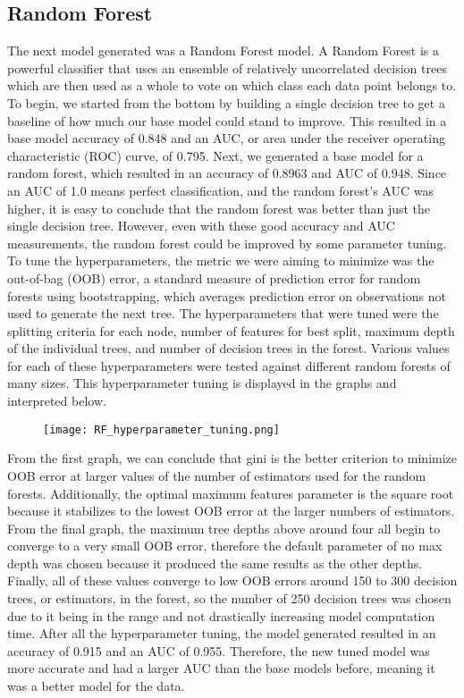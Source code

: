 \documentclass{article}
\begin{document}
\subsection{Random Forest}
The next model generated was a Random Forest model. A Random Forest is a powerful classifier that uses an ensemble of relatively uncorrelated decision trees which are then used as a whole to vote on which class each data point belongs to. To begin, we started from the bottom by building a single decision tree to get a baseline of how much our base model could stand to improve. This resulted in a base model accuracy of 0.848 and an AUC, or area under the receiver operating characteristic (ROC) curve, of 0.795. Next, we generated a base model for a random forest, which resulted in an accuracy of 0.8963 and AUC of 0.948. Since an AUC of 1.0 means perfect classification, and the random forest’s AUC was higher, it is easy to conclude that the random forest was better than just the single decision tree. However, even with these good accuracy and AUC measurements, the random forest could be improved by some parameter tuning. To tune the hyperparameters, the metric we were aiming to minimize was the out-of-bag (OOB) error, a standard measure of prediction error for random forests using bootstrapping, which averages prediction error on observations not used to generate the next tree. The hyperparameters that were tuned were the splitting criteria for each node, number of features for best split, maximum depth of the individual trees, and number of decision trees in the forest. Various values for each of these hyperparameters were tested against different random forests of many sizes. This hyperparameter tuning is displayed in the graphs and interpreted below.
\begin{figure}[htp]
    \centering
    \texttt{[image: RF\_hyperparameter\_tuning.png]}
    \label{fig:randforest}
\end{figure}

\noindent From the first graph, we can conclude that gini is the better criterion to minimize OOB error at larger values of the number of estimators used for the random forests. Additionally, the optimal maximum features parameter is the square root because it stabilizes to the lowest OOB error at the larger numbers of estimators. From the final graph, the maximum tree depths above around four all begin to converge to a very small OOB error, therefore the default parameter of no max depth was chosen because it produced the same results as the other depths. Finally, all of these values converge to low OOB errors around 150 to 300 decision trees, or estimators, in the forest, so the number of 250 decision trees was chosen due to it being in the range and not drastically increasing model computation time. After all the hyperparameter tuning, the model generated resulted in an accuracy of 0.915 and an AUC of 0.955. Therefore, the new tuned model was more accurate and had a larger AUC than the base models before, meaning it was a better model for the data.
\end{document}
